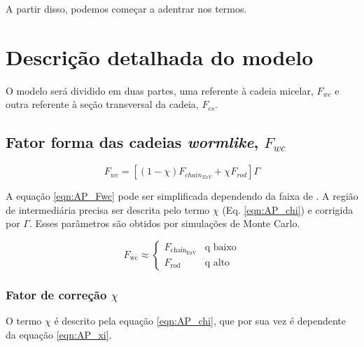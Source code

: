 \begin{apendicesenv}
A partir disso, podemos começar a adentrar nos termos.

\section{Descrição detalhada do modelo}

O modelo será dividido em duas partes, uma referente à cadeia micelar, \(F_{wc}\) e outra referente à seção transversal da cadeia, \(F_{cs}\).

\subsection{Fator forma das cadeias \emph{wormlike}, \(F_{wc}\)}
\label{sec:equacoes_Fwc}

\begin{equation}
F_{wc} = \left[\left(1 - \chi\right)F_{chain_{ExV}} + \chi F_{rod}\right]\Gamma
\label{eqn:AP_Fwc}
\end{equation}

A equação \ref{eqn:AP_Fwc} pode ser simplificada dependendo da faixa de \q. A região de \q intermediária precisa ser descrita pelo termo \(\chi\) (Eq. \ref{eqn:AP_chi}) e corrigida por \(\Gamma\). Esses parâmetros são obtidos por simulações de Monte Carlo.

\begin{equation}
	F_{\text{wc}} \approx 
		\begin{cases}
			F_{\text{chain}_{\text{ExV}}}		& \text{q baixo}  \\
			F_{\text{rod}}						& \text{q alto}
		\end{cases}
	\label{eqn:AP_Fwc_dois_casos}
\end{equation}


\subsubsection{Fator de correção \(\chi\)}
O termo \(\chi\) é descrito pela equação \ref{eqn:AP_chi}, que por sua vez é dependente da equação \ref{eqn:AP_xi}.


\end{apendicesenv}
